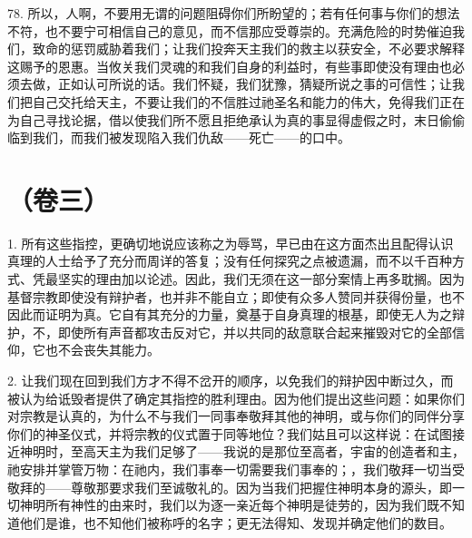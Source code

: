 78. 所以，人啊，不要用无谓的问题阻碍你们所盼望的；若有任何事与你们的想法不符，也不要宁可相信自己的意见，而不信那应受尊崇的。充满危险的时势催迫我们，致命的惩罚威胁着我们；让我们投奔天主我们的救主以获安全，不必要求解释这赐予的恩惠。当攸关我们灵魂的和我们自身的利益时，有些事即使没有理由也必须去做，正如认可所说的话。我们怀疑，我们犹豫，猜疑所说之事的可信性；让我们把自己交托给天主，不要让我们的不信胜过祂圣名和能力的伟大，免得我们正在为自己寻找论据，借以使我们所不愿且拒绝承认为真的事显得虚假之时，末日偷偷临到我们，而我们被发现陷入我们仇敌——死亡——的口中。\par



\section{（卷三）}

1. 所有这些指控，更确切地说应该称之为辱骂，早已由在这方面杰出且配得认识真理的人士给予了充分而周详的答复；没有任何探究之点被遗漏，而不以千百种方式、凭最坚实的理由加以论述。因此，我们无须在这一部分案情上再多耽搁。因为基督宗教即使没有辩护者，也并非不能自立；即使有众多人赞同并获得份量，也不因此而证明为真。它自有其充分的力量，奠基于自身真理的根基，即使无人为之辩护，不，即使所有声音都攻击反对它，并以共同的敌意联合起来摧毁对它的全部信仰，它也不会丧失其能力。\par

2. 让我们现在回到我们方才不得不岔开的顺序，以免我们的辩护因中断过久，而被认为给诋毁者提供了确定其指控的胜利理由。因为他们提出这些问题：如果你们对宗教是认真的，为什么不与我们一同事奉敬拜其他的神明，或与你们的同伴分享你们的神圣仪式，并将宗教的仪式置于同等地位？我们姑且可以这样说：在试图接近神明时，至高天主为我们足够了——我说的是那位至高者，宇宙的创造者和主，祂安排并掌管万物：在祂内，我们事奉一切需要我们事奉的；，我们敬拜一切当受敬拜的——尊敬那要求我们至诚敬礼的。因为当我们把握住神明本身的源头，即一切神明所有神性的由来时，我们以为逐一亲近每个神明是徒劳的，因为我们既不知道他们是谁，也不知他们被称呼的名字；更无法得知、发现并确定他们的数目。\par

